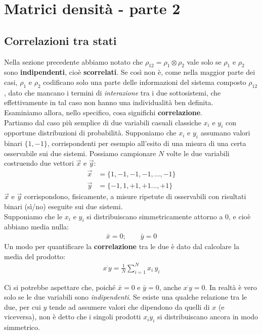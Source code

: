\documentclass[../../InformazioneQuantistica.tex]{subfiles}
\begin{document}
\section{Matrici densità - parte 2}

\subsection{Correlazioni tra stati}
Nella sezione precedente abbiamo notato che $\rho_{12}=\rho_1 \otimes \rho_2$ vale solo se $\rho_1$ e $\rho_2$ sono \textbf{indipendenti}, cioè \textbf{scorrelati}. Se così non è, come nella maggior parte dei casi, $\rho_1$ e $\rho_2$ codificano solo una parte delle informazioni del sistema composto $\rho_{12}$, dato che mancano i termini di \textit{interazione} tra i due sottosistemi, che effettivamente in tal caso non hanno una individualità ben definita.\\

Esaminiamo allora, nello specifico, cosa significhi \textbf{correlazione}.\\
Partiamo dal caso più semplice di due variabili casuali classiche $x_i$ e $y_i$ con opportune distribuzioni di probabilità. Supponiamo che $x_i$ e $y_i$ assumano valori binari $\{1,-1\}$, corrispondenti per esempio all'esito di una misura di una certa osservabile sui due sistemi.
 Possiamo campionare $N$ volte le due variabili costruendo due vettori $\vec{x}$ e $\vec{y}$:
\begin{align*}
\vec{x} &= \{1, -1, -1,-1, \dots, -1\}\\
\vec{y} &= \{-1, 1, +1, +1\dots, +1\}
\end{align*} 
$\vec{x}$ e $\vec{y}$ corrispondono, fisicamente, a misure ripetute di osservabili con risultati binari (sì/no) eseguite sui due sistemi.\\
Supponiamo che le $x_i$ e $y_i$ si distribuiscano simmetricamente attorno a $0$, e cioè abbiano media nulla:
\begin{align*}
\bar{x} = 0; \qquad \bar{y}=0
\end{align*}
Un modo per quantificare la \textbf{correlazione} tra le due è dato dal calcolare la media del prodotto:
\begin{align*}
\overline{x\,y} = \frac{1}{N}\sum_{i=1}^N x_i\,y_i
\end{align*}

Ci si potrebbe aspettare che, poiché $\bar{x}=0$ e $\bar{y}=0$, anche $\overline{x\,y}=0$. In realtà è vero solo se le due variabili sono \textit{indipendenti}. Se esiste una qualche relazione tra le due, per cui $y$ tende ad assumere valori che dipendono da quelli di $x$ (e viceversa), non è detto che i singoli prodotti $x_i y_i$ si distribuiscano ancora in modo simmetrico.\\
\end{document}
